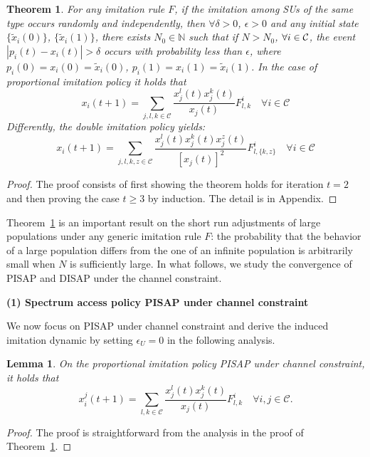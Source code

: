 \documentclass[12pt, onecolumn]{IEEEtran}
\theoremstyle{plain}
\newtheorem{lemma}{Lemma}
\newtheorem{theorem}{Theorem}
\theoremstyle{definition}
\begin{document}
\begin{theorem}
For any imitation rule $F$, if the imitation among SUs of the same type occurs randomly and independently, then $\forall \delta>0$, $\epsilon>0$ and any initial state $\{\widetilde{x}_i(0)\}$, $\{\widetilde{x}_i(1)\}$, there exists $N_{0}\in\mathbb{N}$
such that if $N>N_{0}$, $\forall i\in{\cal C}$, the event $|p_i(t)-x_i(t)|>\delta$ occurs with probability less than $\epsilon$, where
$p_i(0)=x_i(0)=\widetilde{x}_i(0)$, $p_i(1)=x_i(1)=\widetilde{x}_i(1)$. In the case of proportional imitation policy it holds that
\begin{equation*}
x_i(t+1)=\sum_{j,l,k \in \mathcal{C}}  \frac{x_j^l(t)x_j^k(t)}{x_j(t)}F_{l,k}^{i} \quad \forall i\in \mathcal{C}
\end{equation*}
Differently, the double imitation policy yields:
\begin{equation*}
x_i(t+1)=\sum_{j,l,k,z \in \mathcal{C}}  \frac{x_j^l(t)x_j^k(t)x_j^z(t)}{[x_j(t)]^2}F_{l,\{k,z\} }^{i} \quad \forall i\in \mathcal{C}
\end{equation*}

\label{th:finitePop}
\end{theorem}

\begin{proof}
The proof consists of first showing the theorem holds for iteration $t=2$ and then proving the case $t\ge 3$ by induction. The detail is in Appendix.
\end{proof}

Theorem~\ref{th:finitePop} is an important result on the short run adjustments of large populations under any generic imitation rule $F$: the probability that the behavior
of a large population differs from the one of an infinite population is arbitrarily small when $N$ is sufficiently large. In what follows, we study the convergence of PISAP and DISAP under the channel constraint.

\noindent \textbf{(1) Spectrum access policy PISAP under channel constraint}

We now focus on PISAP under channel constraint and derive the induced imitation dynamic by setting $\epsilon_U=0$ in the following analysis.

\begin{lemma}
On the proportional imitation policy PISAP under channel constraint, it holds that
\begin{equation}
x_i^j(t+1) = \sum_{l,k \in \mathcal{C}}  \frac{x_j^l(t)x_j^k(t)}{x_j(t)}F_{l,k}^{i} \quad \forall i,j\in \mathcal{C}.
\label{xijlemma}
\end{equation}
\label{lemma:pop2}
\end{lemma}
\begin{proof}
The proof is straightforward from the analysis in the proof of Theorem~\ref{th:finitePop}.
\end{proof}
\end{document}
